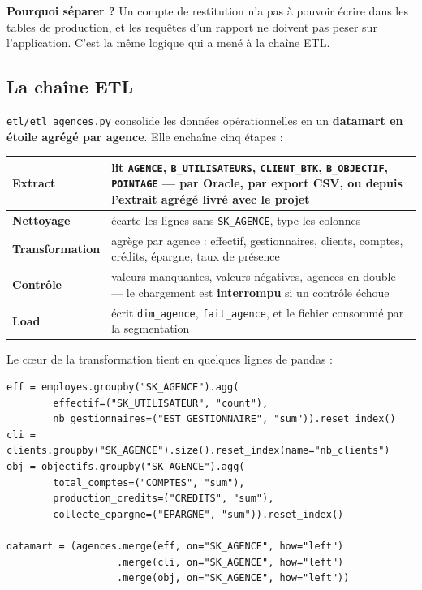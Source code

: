 \textbf{Pourquoi séparer ?} Un compte de restitution n'a pas à pouvoir écrire
dans les tables de production, et les requêtes d'un rapport ne doivent pas
peser sur l'application. C'est la même logique qui a mené à la chaîne ETL.

\subsection{La chaîne ETL}

\texttt{etl/etl\_agences.py} consolide les données opérationnelles en un
\textbf{datamart en étoile agrégé par agence}. Elle enchaîne cinq étapes :

\noindent\begin{tabularx}{\textwidth}{|>{\bfseries}L{3.2cm}|X|}
\hline
Extract & lit \texttt{AGENCE}, \texttt{B\_UTILISATEURS}, \texttt{CLIENT\_BTK}, \texttt{B\_OBJECTIF}, \texttt{POINTAGE} --- par Oracle, par export CSV, ou depuis l'extrait agrégé livré avec le projet\\
\hline
Nettoyage & écarte les lignes sans \texttt{SK\_AGENCE}, type les colonnes\\
\hline
Transformation & agrège par agence : effectif, gestionnaires, clients, comptes, crédits, épargne, taux de présence\\
\hline
Contrôle & valeurs manquantes, valeurs négatives, agences en double --- le chargement est \textbf{interrompu} si un contrôle échoue\\
\hline
Load & écrit \texttt{dim\_agence}, \texttt{fait\_agence}, et le fichier consommé par la segmentation\\
\hline
\end{tabularx}

\vspace{0.6em}
Le c\oe{}ur de la transformation tient en quelques lignes de pandas :

\begin{lstlisting}[style=shell]
eff = employes.groupby("SK_AGENCE").agg(
        effectif=("SK_UTILISATEUR", "count"),
        nb_gestionnaires=("EST_GESTIONNAIRE", "sum")).reset_index()
cli = clients.groupby("SK_AGENCE").size().reset_index(name="nb_clients")
obj = objectifs.groupby("SK_AGENCE").agg(
        total_comptes=("COMPTES", "sum"),
        production_credits=("CREDITS", "sum"),
        collecte_epargne=("EPARGNE", "sum")).reset_index()

datamart = (agences.merge(eff, on="SK_AGENCE", how="left")
                   .merge(cli, on="SK_AGENCE", how="left")
                   .merge(obj, on="SK_AGENCE", how="left"))
\end{lstlisting}

